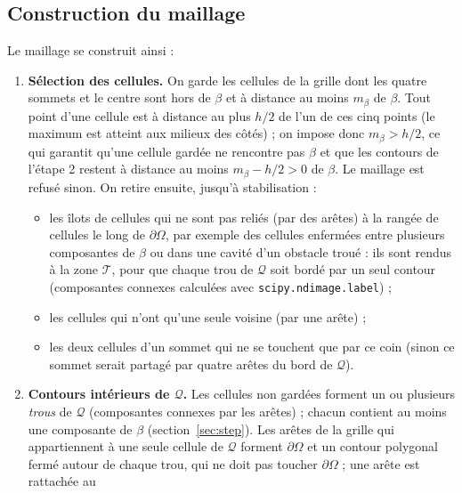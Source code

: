 \documentclass[11pt,a4paper]{article}
\begin{document}
\subsection{Construction du maillage}
\label{sec:construction}

Le maillage se construit ainsi :
\begin{enumerate}
  \item \textbf{Sélection des cellules.} On garde les cellules de la grille
        dont les quatre sommets et le centre sont hors de $\beta$ et à
        distance au moins $m_\beta$ de $\beta$. Tout point d'une cellule est
        à distance au plus $h/2$ de l'un de ces cinq points (le maximum est
        atteint aux milieux des côtés) ; on impose donc $m_\beta > h/2$, ce
        qui garantit qu'une cellule gardée ne rencontre pas $\beta$ et que
        les contours de l'étape 2 restent à distance au moins
        $m_\beta - h/2 > 0$ de $\beta$. Le maillage est refusé sinon. On
        retire ensuite, jusqu'à stabilisation :
        \begin{itemize}
          \item les îlots de cellules qui ne sont pas reliés (par des arêtes)
                à la rangée de cellules le long de $\partial\Omega$, par
                exemple des cellules enfermées entre plusieurs composantes de
                $\beta$ ou dans une cavité d'un obstacle troué : ils sont rendus à la zone $\mathcal{T}$, pour que
                chaque trou de $\mathcal{Q}$ soit bordé par un seul contour
                (composantes connexes calculées avec
                \texttt{scipy.ndimage.label}) ;
          \item les cellules qui n'ont qu'une seule voisine (par une arête) ;
          \item les deux cellules d'un sommet qui ne se touchent que par ce
                coin (sinon ce sommet serait partagé par quatre arêtes du bord
                de $\mathcal{Q}$).
        \end{itemize}
  \item \textbf{Contours intérieurs de $\mathcal{Q}$.} Les cellules non
        gardées forment un ou plusieurs \emph{trous} de $\mathcal{Q}$
        (composantes connexes par les arêtes) ; chacun contient au moins une
        composante de $\beta$ (section~\ref{sec:step}). Les arêtes de la grille
        qui appartiennent à une seule cellule de $\mathcal{Q}$ forment
        $\partial\Omega$ et un contour polygonal fermé autour de chaque trou,
        qui ne doit pas toucher $\partial\Omega$ ; une arête est rattachée au

\end{enumerate}
\end{document}
